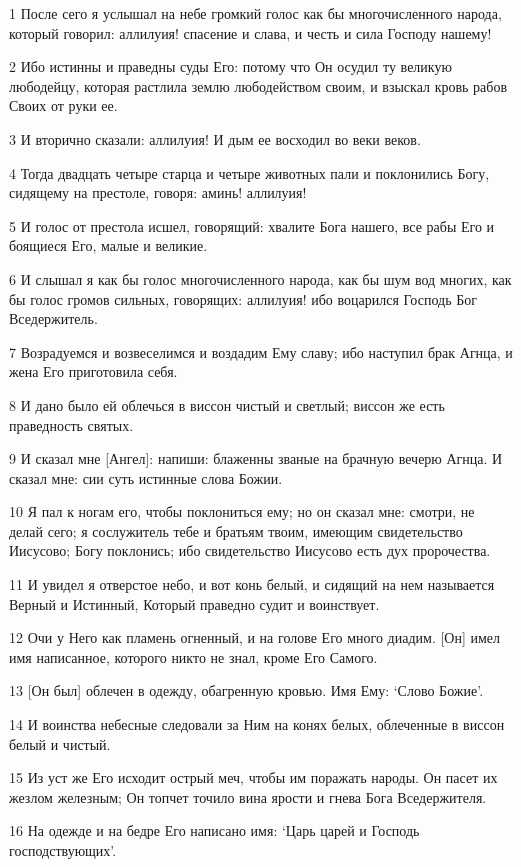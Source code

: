 \par 1 После сего я услышал на небе громкий голос как бы многочисленного народа, который говорил: аллилуия! спасение и слава, и честь и сила Господу нашему!
\par 2 Ибо истинны и праведны суды Его: потому что Он осудил ту великую любодейцу, которая растлила землю любодейством своим, и взыскал кровь рабов Своих от руки ее.
\par 3 И вторично сказали: аллилуия! И дым ее восходил во веки веков.
\par 4 Тогда двадцать четыре старца и четыре животных пали и поклонились Богу, сидящему на престоле, говоря: аминь! аллилуия!
\par 5 И голос от престола исшел, говорящий: хвалите Бога нашего, все рабы Его и боящиеся Его, малые и великие.
\par 6 И слышал я как бы голос многочисленного народа, как бы шум вод многих, как бы голос громов сильных, говорящих: аллилуия! ибо воцарился Господь Бог Вседержитель.
\par 7 Возрадуемся и возвеселимся и воздадим Ему славу; ибо наступил брак Агнца, и жена Его приготовила себя.
\par 8 И дано было ей облечься в виссон чистый и светлый; виссон же есть праведность святых.
\par 9 И сказал мне [Ангел]: напиши: блаженны званые на брачную вечерю Агнца. И сказал мне: сии суть истинные слова Божии.
\par 10 Я пал к ногам его, чтобы поклониться ему; но он сказал мне: смотри, не делай сего; я сослужитель тебе и братьям твоим, имеющим свидетельство Иисусово; Богу поклонись; ибо свидетельство Иисусово есть дух пророчества.
\par 11 И увидел я отверстое небо, и вот конь белый, и сидящий на нем называется Верный и Истинный, Который праведно судит и воинствует.
\par 12 Очи у Него как пламень огненный, и на голове Его много диадим. [Он] имел имя написанное, которого никто не знал, кроме Его Самого.
\par 13 [Он был] облечен в одежду, обагренную кровью. Имя Ему: `Слово Божие'.
\par 14 И воинства небесные следовали за Ним на конях белых, облеченные в виссон белый и чистый.
\par 15 Из уст же Его исходит острый меч, чтобы им поражать народы. Он пасет их жезлом железным; Он топчет точило вина ярости и гнева Бога Вседержителя.
\par 16 На одежде и на бедре Его написано имя: `Царь царей и Господь господствующих'.
